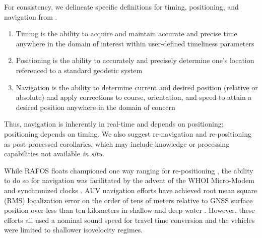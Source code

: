 
For consistency, we delineate specific definitions for timing, positioning, and navigation from \citet{Howe2019}.
\begin{enumerate}
	\item Timing is the ability to acquire and maintain accurate and precise time anywhere in the domain of interest within user-defined timeliness parameters
	\item Positioning is the ability to accurately and precisely determine one's location referenced to a standard geodetic system
	\item Navigation is the ability to determine current and desired position (relative or absolute) and apply corrections to course, orientation, and speed to attain a desired position anywhere in the domain of concern
\end{enumerate}
Thus, navigation is inherently in real-time and depends on positioning; positioning depends on timing.
We also suggest re-navigation and re-positioning as post-processed corollaries, which may include knowledge or processing capabilities not available \textit{in situ}.

While RAFOS floats championed one way ranging for re-positioning \citep{Rossby1986,duda_evaluation_2006}, the ability to do so for navigation was facilitated by  the advent of the WHOI Micro-Modem \citep{Singh2006} and synchronized clocks \citep{rypkema_one-way_2017}.
AUV navigation efforts have achieved root mean square (RMS) localization error on the order of tens of meters relative to GNSS surface position over less than ten kilometers in shallow \citep{Eustice2007,Claus2018,kepper_mems_2017} and deep water \citep{Kunz2008,jakuba_long-baseline_2008,Webster2009}.
However, these efforts all used a nominal sound speed for travel time conversion and the vehicles were limited to shallower isovelocity regimes.

